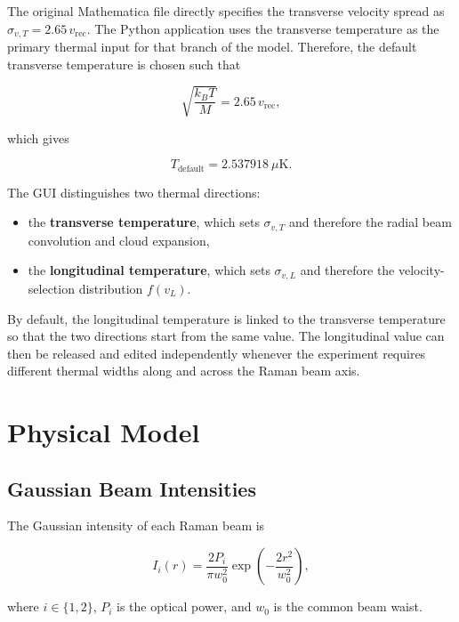 \documentclass[11pt,a4paper]{article}
\begin{document}
The original Mathematica file directly specifies the transverse velocity spread as
$\sigma_{v,T} = 2.65\,v_{\mathrm{rec}}$. The Python application uses the transverse temperature as
the primary thermal input for that branch of the model. Therefore, the default transverse
temperature is chosen such that

\begin{equation}
\sqrt{\frac{k_B T}{M}} = 2.65\,v_{\mathrm{rec}},
\end{equation}

which gives

\begin{equation}
T_{\mathrm{default}} = 2.537918~\mu\mathrm{K}.
\end{equation}

The GUI distinguishes two thermal directions:

\begin{itemize}
  \item the \textbf{transverse temperature}, which sets $\sigma_{v,T}$ and therefore the radial
  beam convolution and cloud expansion,
  \item the \textbf{longitudinal temperature}, which sets $\sigma_{v,L}$ and therefore the
  velocity-selection distribution $f(v_L)$.
\end{itemize}

By default, the longitudinal temperature is linked to the transverse temperature so that the two
directions start from the same value. The longitudinal value can then be released and edited
independently whenever the experiment requires different thermal widths along and across the Raman
beam axis.

\section{Physical Model}

\subsection{Gaussian Beam Intensities}

The Gaussian intensity of each Raman beam is

\begin{equation}
I_i(r) = \frac{2P_i}{\pi w_0^2}\exp\!\left(-\frac{2r^2}{w_0^2}\right),
\end{equation}

where $i \in \{1,2\}$, $P_i$ is the optical power, and $w_0$ is the common beam waist.
\end{document}
